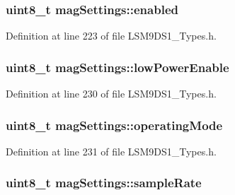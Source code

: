 \subsubsection[{\texorpdfstring{enabled}{enabled}}]{\setlength{\rightskip}{0pt plus 5cm}uint8\+\_\+t mag\+Settings\+::enabled}\hypertarget{structmag_settings_a97f8e5c4baf3fc9a662f84fedb188f3c}{}\label{structmag_settings_a97f8e5c4baf3fc9a662f84fedb188f3c}


Definition at line 223 of file L\+S\+M9\+D\+S1\+\_\+\+Types.\+h.

\subsubsection[{\texorpdfstring{low\+Power\+Enable}{lowPowerEnable}}]{\setlength{\rightskip}{0pt plus 5cm}uint8\+\_\+t mag\+Settings\+::low\+Power\+Enable}\hypertarget{structmag_settings_abd59df268c0798fceacea68b956009df}{}\label{structmag_settings_abd59df268c0798fceacea68b956009df}


Definition at line 230 of file L\+S\+M9\+D\+S1\+\_\+\+Types.\+h.

\subsubsection[{\texorpdfstring{operating\+Mode}{operatingMode}}]{\setlength{\rightskip}{0pt plus 5cm}uint8\+\_\+t mag\+Settings\+::operating\+Mode}\hypertarget{structmag_settings_ae3f0044de2fbdff6d7b830c36f26c450}{}\label{structmag_settings_ae3f0044de2fbdff6d7b830c36f26c450}


Definition at line 231 of file L\+S\+M9\+D\+S1\+\_\+\+Types.\+h.

\subsubsection[{\texorpdfstring{sample\+Rate}{sampleRate}}]{\setlength{\rightskip}{0pt plus 5cm}uint8\+\_\+t mag\+Settings\+::sample\+Rate}\hypertarget{structmag_settings_aca3dbf81e533dce344e618a3df199c1e}{}\label{structmag_settings_aca3dbf81e533dce344e618a3df199c1e}


